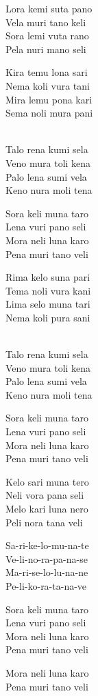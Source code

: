 \begin{lyrics}
Lora kemi suta pano\\
Vela muri tano keli\\
Sora lemi vuta rano\\
Pela nuri mano seli

Kira temu lona sari\\
Nema koli vura tani\\
Mira lemu pona kari\\
Sema noli mura pani

\\
Talo rena kumi sela\\
Veno mura toli kena\\
Palo lena sumi vela\\
Keno nura moli tena

Sora keli muna taro\\
Lena vuri pano seli\\
Mora neli luna karo\\
Pena muri tano veli

Rima kelo suna pari\\
Tema noli vura kani\\
Lima selo muna tari\\
Nema koli pura sani

\\
Talo rena kumi sela\\
Veno mura toli kena\\
Palo lena sumi vela\\
Keno nura moli tena

Sora keli muna taro\\
Lena vuri pano seli\\
Mora neli luna karo\\
Pena muri tano veli

Kelo sari muna tero\\
Neli vora pana seli\\
Melo kari luna nero\\
Peli nora tana veli

Sa-ri-ke-lo-mu-na-te\\
Ve-li-no-ra-pa-na-se\\
Ma-ri-se-lo-lu-na-ne\\
Pe-li-ko-ra-ta-na-ve

Sora keli muna taro\\
Lena vuri pano seli\\
Mora neli luna karo\\
Pena muri tano veli

Mora neli luna karo\\
Pena muri tano veli
\end{lyrics}

